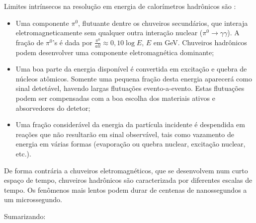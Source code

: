 Limites intrínsecos na resolução em energia de calorímetros hadrônicos são
\cite{hadcal}:

\begin{itemize}
  \item Uma componente $\pi^{0}$, flutuante dentre os chuveiros secundários, que
  interaja eletromagneticamente sem qualquer outra interação nuclear ($\pi^{0}
  \rightarrow \gamma\gamma$). A fração de $\pi^{0}$'s é dada por
  $\frac{\pi^{0}}{all} \approx 0,10 \log{E}$, $E$ em GeV. Chuveiros hadrônicos
  podem desenvolver uma componente eletromagnética dominante;

\item Uma boa parte da energia disponível é convertida em excitação e quebra
  de núcleos atômicos. Somente uma pequena fração desta energia aparecerá como
  sinal detetável, havendo largas flutuações evento-a-evento. Estas flutuações
  podem ser compensadas com a boa escolha dos materiais ativos e absorvedores
  do detetor;

\item Uma fração considerável da energia da partícula incidente é despendida
  em reações que não resultarão em sinal observável, tais como vazamento de
  energia em várias formas (evaporação ou quebra nuclear, excitação nuclear,
  etc.).
\end{itemize}

De forma contrária a chuveiros eletromagnéticos, que se desenvolvem num curto
espaço de tempo, chuveiros hadrônicos são caracterizada por diferentes escalas
de tempo. Os fenômenos mais lentos podem durar de centenas de nanossegundos a
um microssegundo.

Sumarizando:

